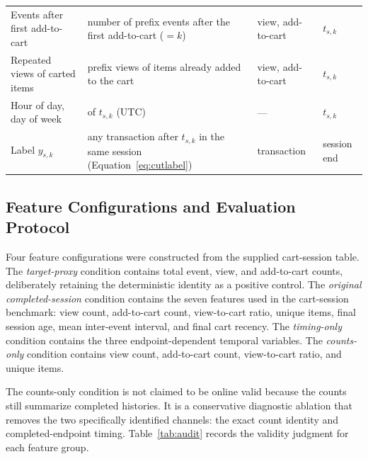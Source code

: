 \documentclass[conference, letterpaper]{IEEEtran}
\begin{document}
\begin{table}[t]
\begin{tabularx}{\textwidth}{@{}L{0.25\textwidth}YL{0.17\textwidth}L{0.15\textwidth}@{}}
Events after first add-to-cart & number of prefix events after the first add-to-cart ($=k$) & view, add-to-cart & $t_{s,k}$ \\
Repeated views of carted items & prefix views of items already added to the cart & view, add-to-cart & $t_{s,k}$ \\
Hour of day, day of week & of $t_{s,k}$ (UTC) & --- & $t_{s,k}$ \\
Label $y_{s,k}$ & any transaction after $t_{s,k}$ in the same session (Equation~\ref{eq:cutlabel}) & transaction & session end \\
\bottomrule
\end{tabularx}
\end{table}

\subsection{Feature Configurations and Evaluation Protocol}
Four feature configurations were constructed from the supplied cart-session table. The \emph{target-proxy} condition contains total event, view, and add-to-cart counts, deliberately retaining the deterministic identity as a positive control. The \emph{original completed-session} condition contains the seven features used in the cart-session benchmark: view count, add-to-cart count, view-to-cart ratio, unique items, final session age, mean inter-event interval, and final cart recency. The \emph{timing-only} condition contains the three endpoint-dependent temporal variables. The \emph{counts-only} condition contains view count, add-to-cart count, view-to-cart ratio, and unique items.

The counts-only condition is not claimed to be online valid because the counts still summarize completed histories. It is a conservative diagnostic ablation that removes the two specifically identified channels: the exact count identity and completed-endpoint timing. Table~\ref{tab:audit} records the validity judgment for each feature group.
\end{document}
